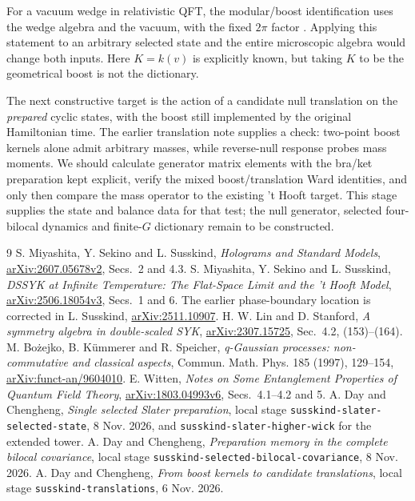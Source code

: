 \documentclass[11pt]{article}
\begin{document}
For a vacuum wedge in relativistic QFT, the modular/boost
identification uses the wedge algebra and the vacuum, with the
fixed $2\pi$ factor \cite[Sec.~5]{Witten}. Applying this statement
to an arbitrary selected state and the entire microscopic algebra
would change both inputs. Here $K=k(v)$ is explicitly known,
but taking $K$ to be the geometrical boost is not the dictionary.

The next constructive target is the action of a candidate null
translation on the \emph{prepared} cyclic states, with the boost
still implemented by the original Hamiltonian time. The earlier
translation note \cite{translations} supplies a check:
two-point boost kernels alone admit arbitrary masses, while
reverse-null response probes mass moments. We should calculate
generator matrix elements with the bra/ket preparation kept
explicit, verify the mixed boost/translation Ward identities,
and only then compare the mass operator to the existing
't Hooft target. This stage supplies the state and balance data
for that test; the null generator, selected four-bilocal dynamics
and finite-$G$ dictionary remain to be constructed.

\begin{thebibliography}{9}\small
{} S. Miyashita, Y. Sekino and L. Susskind,
\emph{Holograms and Standard Models},
\href{https://arxiv.org/abs/2607.05678v2}{arXiv:2607.05678v2},
Secs.~2 and 4.3.
 S. Miyashita, Y. Sekino and L. Susskind,
\emph{DSSYK at Infinite Temperature: The Flat-Space Limit and
the 't Hooft Model},
\href{https://arxiv.org/abs/2506.18054v3}{arXiv:2506.18054v3},
Secs.~1 and 6. The earlier phase-boundary location is corrected
in L. Susskind, \href{https://arxiv.org/abs/2511.10907}{arXiv:2511.10907}.
 H. W. Lin and D. Stanford,
\emph{A symmetry algebra in double-scaled SYK},
\href{https://arxiv.org/abs/2307.15725}{arXiv:2307.15725},
Sec.~4.2, (153)--(164).
 M. Bo\.{z}ejko, B. K\"ummerer and R. Speicher,
\emph{q-Gaussian processes: non-commutative and classical aspects},
Commun. Math. Phys. 185 (1997), 129--154,
\href{https://arxiv.org/abs/funct-an/9604010}{arXiv:funct-an/9604010}.
 E. Witten,
\emph{Notes on Some Entanglement Properties of Quantum Field Theory},
\href{https://arxiv.org/abs/1803.04993v6}{arXiv:1803.04993v6},
Secs.~4.1--4.2 and 5.
 A. Day and Chengheng,
\emph{Single selected Slater preparation}, local stage
\texttt{susskind-slater-selected-state}, 8 Nov. 2026,
and \texttt{susskind-slater-higher-wick} for the extended tower.
 A. Day and Chengheng,
\emph{Preparation memory in the complete bilocal covariance},
local stage \texttt{susskind-selected-bilocal-covariance},
8 Nov. 2026.
 A. Day and Chengheng,
\emph{From boost kernels to candidate translations}, local stage
\texttt{susskind-translations}, 6 Nov. 2026.
\end{thebibliography}
\end{document}
